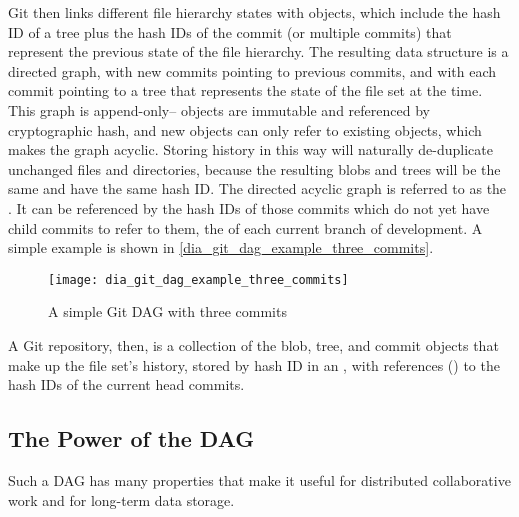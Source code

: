 Git then links different file hierarchy states with  objects,
which include the hash ID of a tree plus the hash IDs of the commit (or multiple
commits) that represent the previous state of the file hierarchy. The resulting
data structure is a directed graph, with new commits pointing to previous
commits, and with each commit pointing to a tree that represents the state of
the file set at the time. This graph is append-only-- objects are immutable and
referenced by cryptographic hash, and new objects can only refer to existing
objects, which makes the graph acyclic. Storing history in this way will
naturally de-duplicate unchanged files and directories, because the resulting
blobs and trees will be the same and have the same hash ID. The directed acyclic
graph is referred to as the . It can be referenced by the hash IDs
of those commits which do not yet have child commits to refer to them, the
 of each current branch of development. A simple example is shown
in \autoref{dia_git_dag_example_three_commits}.

\begin{figure}[h]
    \centering
    \texttt{[image: dia\_git\_dag\_example\_three\_commits]}
    \caption{A simple Git DAG with three commits}
    \label{dia_git_dag_example_three_commits}
\end{figure}

A Git repository, then, is a collection of the blob, tree, and commit objects
that make up the file set's history, stored by hash ID in an , with references () to the hash IDs of the current head
commits\cite{git_initial_readme}.

%

\subsection{The Power of the DAG}

Such a DAG has many properties that make it useful for distributed collaborative
work and for long-term data storage.

